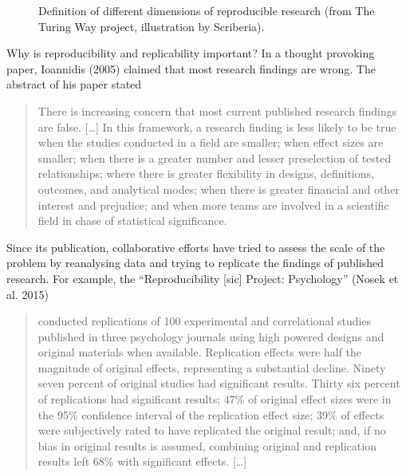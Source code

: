 \documentclass[
  11pt,
  letterpaper,
]{scrbook}
\theoremstyle{definition}
\theoremstyle{definition}
\theoremstyle{remark}
\begin{document}
\begin{figure}[ht!]


\caption{\label{fig-turingrepdo}Definition of different dimensions of
reproducible research (from The Turing Way project, illustration by
Scriberia).}

\end{figure}%

Why is reproducibility and replicability important? In a thought
provoking paper, Ioannidis (2005) claimed that most research findings
are wrong. The abstract of his paper stated

\begin{quote}
There is increasing concern that most current published research
findings are false. {[}\ldots{]} In this framework, a research finding
is less likely to be true when the studies conducted in a field are
smaller; when effect sizes are smaller; when there is a greater number
and lesser preselection of tested relationships; where there is greater
flexibility in designs, definitions, outcomes, and analytical modes;
when there is greater financial and other interest and prejudice; and
when more teams are involved in a scientific field in chase of
statistical significance.
\end{quote}

Since its publication, collaborative efforts have tried to assess the
scale of the problem by reanalysing data and trying to replicate the
findings of published research. For example, the ``Reproducibility
{[}sic{]} Project: Psychology'' (Nosek et al. 2015)

\begin{quote}
conducted replications of 100 experimental and correlational studies
published in three psychology journals using high powered designs and
original materials when available. Replication effects were half the
magnitude of original effects, representing a substantial decline.
Ninety seven percent of original studies had significant results. Thirty
six percent of replications had significant results; 47\% of original
effect sizes were in the 95\% confidence interval of the replication
effect size; 39\% of effects were subjectively rated to have replicated
the original result; and, if no bias in original results is assumed,
combining original and replication results left 68\% with significant
effects. {[}\ldots{]}
\end{quote}
\end{document}
